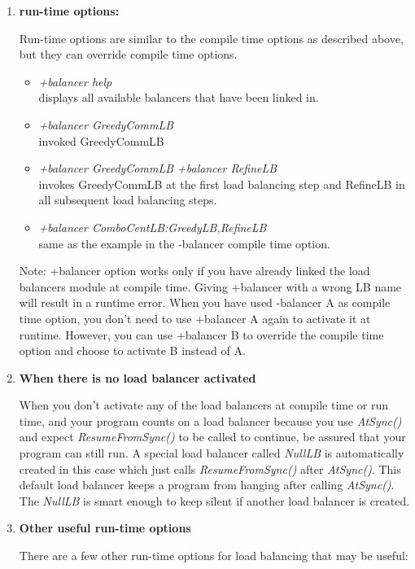 \begin{enumerate}
\item {\bf run-time options:}

Run-time options are similar to the compile time options as described above,
but they can override compile time options.

\begin{itemize}
\item {\em +balancer help} \\
  displays all available balancers that have been linked in.
\item {\em +balancer GreedyCommLB} \\
  invoked GreedyCommLB
\item {\em +balancer GreedyCommLB +balancer RefineLB} \\
  invokes GreedyCommLB at the first load balancing step and RefineLB in all
subsequent load balancing steps.
\item {\em +balancer ComboCentLB:GreedyLB,RefineLB}  \\
  same as the example in the -balancer compile time option.
\end{itemize}

Note: +balancer option works only if you have already linked the load balancers module at compile time. 
Giving +balancer with a wrong LB name will result in a runtime error.
When you have used -balancer A as compile time option, you don't need to use 
+balancer A again to activate it at runtime. However, you can 
use +balancer B to override the compile time option and choose to
activate B instead of A.

\item {\bf When there is no load balancer activated}

When you don't activate any of the load balancers at compile time or run time, 
and your program counts on a load balancer because you use {\em AtSync()}
and expect {\em ResumeFromSync()} to be called to continue,
be assured that your program can still run. 
A special load balancer called {\em NullLB} is 
automatically created in this case which just
calls {\em ResumeFromSync()} after {\em AtSync()}. 
This default load balancer keeps a program from hanging after calling {\em AtSync()}.
The {\em NullLB} is smart enough to keep silent if another 
load balancer is created.

\item {\bf Other useful run-time options}

There are a few other run-time options for load balancing that may be useful:


\end{enumerate}
